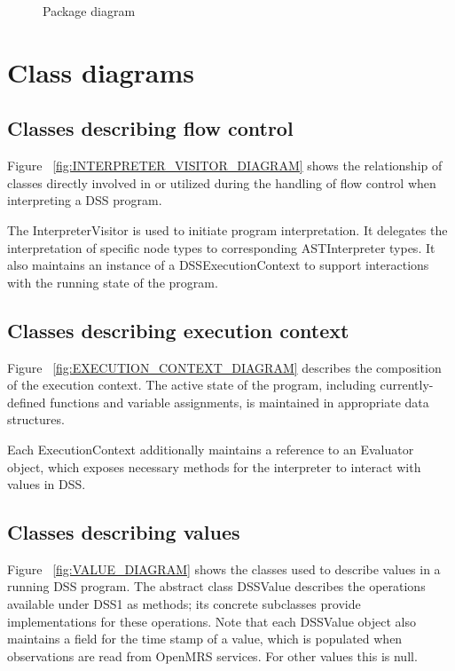 \documentclass[12pt,letterpaper]{article}
\begin{document}
{\begin{figure}
\begin{center}
\begin{tikzpicture}[node distance=0.33in]
\end{tikzpicture}
\end{center}
\caption{Package diagram}
\label{fig:PACKAGE_DIAGRAM}
\end{figure}


\newpage 
\section{Class diagrams} \label{sec:CLASS_DIAGRAMS}

\subsection{Classes describing flow control}

Figure ~\ref{fig:INTERPRETER_VISITOR_DIAGRAM} shows the relationship 
of classes directly involved in or utilized during the handling of flow 
control when interpreting a DSS program.

The InterpreterVisitor is used to initiate program interpretation. It 
delegates the interpretation of specific node types to corresponding 
ASTInterpreter types. It also maintains an instance of a DSSExecutionContext 
to support interactions with the running state of the program.

\subsection{Classes describing execution context}

Figure ~\ref{fig:EXECUTION_CONTEXT_DIAGRAM} describes the 
composition of the execution context. The active state of the program, 
including currently-defined functions and variable assignments, is maintained in appropriate data structures.

Each ExecutionContext additionally maintains a reference to an Evaluator 
object, which exposes necessary methods for the interpreter to interact 
with values in DSS.

\subsection{Classes describing values}

Figure ~\ref{fig:VALUE_DIAGRAM} shows the classes used to describe values in 
a running DSS program. The abstract class DSSValue describes the operations 
available under DSS1 as methods; its concrete subclasses provide 
implementations for these operations. Note that each DSSValue object also 
maintains a field for the time stamp of a value, which is populated when 
observations are read from OpenMRS services. For other values this is null.

}
\end{document}
